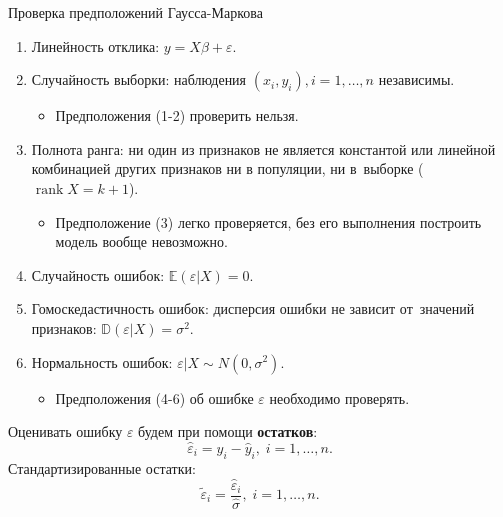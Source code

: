 \documentclass[9pt,pdf,utf8,hyperref={unicode},aspectratio=169]{beamer}
\DeclareMathOperator{\rank}{rank}
\begin{document}
\begin{frame}{Проверка предположений Гаусса-Маркова}
    \begin{enumerate}
    \item Линейность отклика: $y = X\beta+\varepsilon.$
    \item Случайность выборки: наблюдения $(x_i,y_i), i=1,\dots,n$ независимы.
    \begin{itemize}
    \item Предположения (1-2) проверить нельзя.
    \end{itemize}
    \item Полнота ранга: ни один из признаков не является константой или линейной комбинацией других признаков ни в популяции, ни в~выборке ($\rank X = k+1$).
    \begin{itemize}
    \item Предположение (3) легко проверяется, без его выполнения построить модель вообще невозможно.
    \end{itemize}
     \item Случайность ошибок: $\mathbb{E}\left(\varepsilon\left|X\right.\right) = 0.$
     \item Гомоскедастичность ошибок: дисперсия ошибки не зависит от~значений признаков: $\mathbb{D}\left(\varepsilon\left|X\right.\right)=\sigma^2.$
    \item Нормальность ошибок: $\varepsilon\left| X\right. \sim N\left(0,\sigma^2\right).$
    \begin{itemize}

    \item Предположения (4-6) об ошибке $\varepsilon$ необходимо проверять.
    \end{itemize}
    \end{enumerate}

    \bigskip

    Оценивать ошибку $\varepsilon$ будем при помощи \textbf{остатков}:
    $$\hat{\varepsilon}_i = y_i - \hat{y}_i, \; i=1,\dots,n.$$
    Стандартизированные остатки:
    $$\tilde{\varepsilon}_i = \frac{\hat{\varepsilon}_i}{\hat{\sigma}}, \; i=1,\dots,n.$$
\end{frame}
\end{document}
